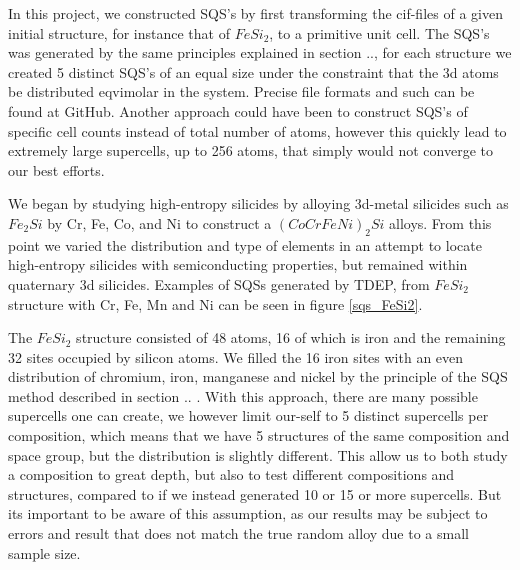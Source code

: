 In this project, we constructed SQS's by first transforming the cif-files of a given initial structure, for instance that of $FeSi_2$, to a primitive unit cell. The SQS's was generated by the same principles explained in section .., for each structure we created 5 distinct SQS's of an equal size under the constraint that the 3d atoms be distributed eqvimolar in the system. Precise file formats and such can be found at GitHub. Another approach could have been to construct SQS's of specific cell counts instead of total number of atoms, however this quickly lead to extremely large supercells, up to 256 atoms, that simply would not converge to our best efforts. 

We began by studying high-entropy silicides by alloying 3d-metal silicides such as $Fe_2Si$ by Cr, Fe, Co, and Ni to construct a $(CoCrFeNi)_2Si$ alloys. From this point we varied the distribution and type of elements in an attempt to locate high-entropy silicides with semiconducting properties, but remained within quaternary 3d silicides. Examples of SQSs generated by TDEP, from $FeSi_2$ structure with Cr, Fe, Mn and Ni can be seen in figure \ref{sqs_FeSi2}.

The $FeSi_2$ structure consisted of 48 atoms, 16 of which is iron and the remaining 32 sites occupied by silicon atoms. We filled the 16 iron sites with an even distribution of chromium, iron, manganese and nickel by the principle of the SQS method described in section .. . With this approach, there are many possible supercells one can create, we however limit our-self to 5 distinct supercells per composition, which means that we have 5 structures of the same composition and space group, but the distribution is slightly different. This allow us to both study a composition to great depth, but also to test different compositions and structures, compared to if we instead generated 10 or 15 or more supercells. But its important to be aware of this assumption, as our results may be subject to errors and result that does not match the true random alloy due to a small sample size.

